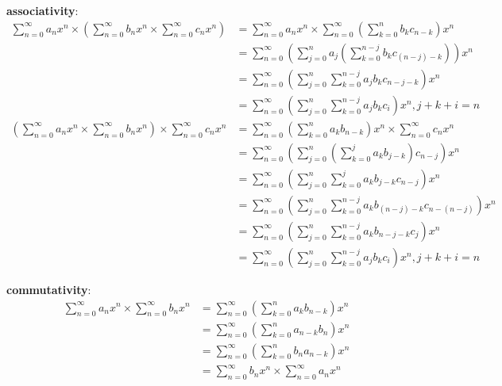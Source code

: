 \documentclass[fleqn]{article}
\begin{document}
            \textbf{associativity}:
            \begin{align}
                \sum\limits_{n = 0}^{\infty} a_n x^n \times \left(\sum\limits_{n = 0}^{\infty} b_n x^n \times \sum\limits_{n = 0}^{\infty} c_n x^n\right)
                    &= \sum\limits_{n = 0}^{\infty} a_n x^n \times \sum\limits_{n = 0}^{\infty}\left(\sum\limits_{k = 0}^{n} b_k c_{n - k}\right) x^n \\
                    &= \sum\limits_{n = 0}^{\infty} \left(\sum\limits_{j = 0}^{n} a_j \left(\sum\limits_{k = 0}^{n - j} b_k c_{(n - j) - k}\right)\right) x^n \\
                    &= \sum\limits_{n = 0}^{\infty} \left(\sum\limits_{j = 0}^{n} \sum\limits_{k = 0}^{n - j} a_j b_k c_{n - j - k}\right) x^n \\
                    &= \sum\limits_{n = 0}^{\infty} \left(\sum\limits_{j = 0}^{n} \sum\limits_{k = 0}^{n - j} a_j b_k c_i\right) x^n, j + k + i = n \\
                \left(\sum\limits_{n = 0}^{\infty} a_n x^n \times \sum\limits_{n = 0}^{\infty} b_n x^n\right) \times \sum\limits_{n = 0}^{\infty} c_n x^n
                    &= \sum\limits_{n = 0}^{\infty} \left(\sum\limits_{k = 0}^{n} a_k b_{n - k}\right) x^n \times \sum\limits_{n = 0}^{\infty} c_n x^n \\
                    &= \sum\limits_{n = 0}^{\infty} \left(\sum\limits_{j = 0}^{n} \left(\sum\limits_{k = 0}^{j} a_k b_{j - k}\right) c_{n - j}\right) x^n \\
                    &= \sum\limits_{n = 0}^{\infty} \left(\sum\limits_{j = 0}^{n} \sum\limits_{k = 0}^{j} a_k b_{j - k} c_{n - j}\right) x^n \\
                    &= \sum\limits_{n = 0}^{\infty} \left(\sum\limits_{j = 0}^{n} \sum\limits_{k = 0}^{n - j} a_k b_{(n - j) - k} c_{n - (n - j)}\right) x^n \\
                    &= \sum\limits_{n = 0}^{\infty} \left(\sum\limits_{j = 0}^{n} \sum\limits_{k = 0}^{n - j} a_k b_{n - j - k} c_j\right) x^n \\
                    &= \sum\limits_{n = 0}^{\infty} \left(\sum\limits_{j = 0}^{n} \sum\limits_{k = 0}^{n - j} a_j b_k c_i\right) x^n, j + k + i = n
            \end{align}
            
            
            \textbf{commutativity}:
            \begin{align}
                \sum\limits_{n = 0}^{\infty} a_n x^n \times \sum\limits_{n = 0}^{\infty} b_n x^n 
                    &= \sum\limits_{n = 0}^{\infty} \left(\sum\limits_{k = 0}^{n} a_k b_{n - k}\right) x^n \\
                    &= \sum\limits_{n = 0}^{\infty} \left(\sum\limits_{k = 0}^{n} a_{n - k} b_n\right) x^n \\
                    &= \sum\limits_{n = 0}^{\infty} \left(\sum\limits_{k = 0}^{n} b_n a_{n - k}\right) x^n \\
                    &= \sum\limits_{n = 0}^{\infty} b_n x^n \times \sum\limits_{n = 0}^{\infty} a_n x^n
            \end{align}
            
\end{document}

